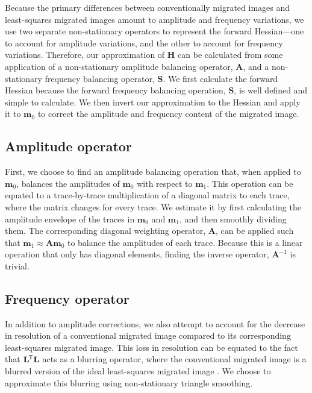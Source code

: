    Because the primary differences between conventionally migrated images and least-squares migrated images amount to amplitude and frequency variations, we use two separate non-stationary operators to represent the forward Hessian---one to account for amplitude variations, and the other to account for frequency variations. 
    Therefore, our approximation of $\mathbf{H}$ can be calculated from some application of a non-stationary amplitude balancing operator, $\mathbf{A}$, and a non-stationary frequency balancing operator, $\mathbf{S}$.
    We first calculate the forward Hessian because the forward frequency balancing operation, $\mathbf{S}$, is well defined and simple to calculate. 
    We then invert our approximation to the Hessian and apply it to $\mathbf{m}_0$ to correct the amplitude and frequency content of the migrated image.

\subsection{Amplitude operator}
    First, we choose to find an amplitude balancing operation that, when applied to $\mathbf{m}_0$, balances the amplitudes of $\mathbf{m}_0$ with respect to $\mathbf{m}_1$. 
    This operation can be equated to a trace-by-trace multiplication of a diagonal matrix to each trace, where the matrix changes for every trace.
    We estimate it by first calculating the amplitude envelope of the traces in $\mathbf{m}_0$ and $\mathbf{m}_1$, and then smoothly dividing them.
    The corresponding diagonal weighting operator, $\mathbf{A}$, can be applied such that $\mathbf{m}_1 \approx \mathbf{A}\mathbf{m}_0$ to balance the amplitudes of each trace.
    Because this is a linear operation that only has diagonal elements, finding the inverse operator, $\mathbf{A}^{-1}$ is trivial. 

\subsection{Frequency operator}
    In addition to amplitude corrections, we also attempt to account for the decrease in resolution of a conventional migrated image compared to its corresponding least-squares migrated image. 
    This loss in resolution can be equated to the fact that $\mathbf{L}^{\mkern-1.5mu\mathsf{T}}\mathbf{L}$ acts as a blurring operator, where the conventional migrated image is a blurred version of the ideal least-squares migrated image \cite[]{poststack}. 
    We choose to approximate this blurring using non-stationary triangle smoothing.

